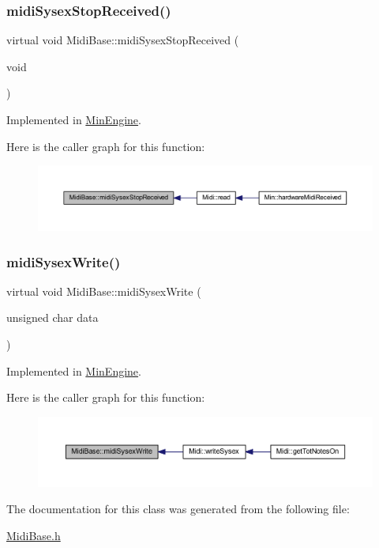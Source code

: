 \subsubsection{\texorpdfstring{midi\+Sysex\+Stop\+Received()}{midiSysexStopReceived()}}
{\footnotesize\ttfamily virtual void Midi\+Base\+::midi\+Sysex\+Stop\+Received (\begin{DoxyParamCaption}\item[{void}]{ }\end{DoxyParamCaption})\hspace{0.3cm}{\ttfamily [pure virtual]}}



Implemented in \hyperlink{class_min_engine_a1378bc2f4ad5d072392a498f5ef9e8e8}{Min\+Engine}.

Here is the caller graph for this function\+:
\nopagebreak
\begin{figure}[H]
\begin{center}
\leavevmode
\includegraphics[width=350pt]{class_midi_base_a14d11f47e731a26535f855a99893d092_icgraph}
\end{center}
\end{figure}
\mbox{\label{class_midi_base_a747dece3a9e16a13766073d9e675887b}} 
\subsubsection{\texorpdfstring{midi\+Sysex\+Write()}{midiSysexWrite()}}
{\footnotesize\ttfamily virtual void Midi\+Base\+::midi\+Sysex\+Write (\begin{DoxyParamCaption}\item[{unsigned char}]{data }\end{DoxyParamCaption})\hspace{0.3cm}{\ttfamily [pure virtual]}}



Implemented in \hyperlink{class_min_engine_a10593d7e2c9bc02a3cffa92a522da294}{Min\+Engine}.

Here is the caller graph for this function\+:
\nopagebreak
\begin{figure}[H]
\begin{center}
\leavevmode
\includegraphics[width=350pt]{class_midi_base_a747dece3a9e16a13766073d9e675887b_icgraph}
\end{center}
\end{figure}


The documentation for this class was generated from the following file\+:\begin{DoxyCompactItemize}
\item 
\hyperlink{_midi_base_8h}{Midi\+Base.\+h}\end{DoxyCompactItemize}
